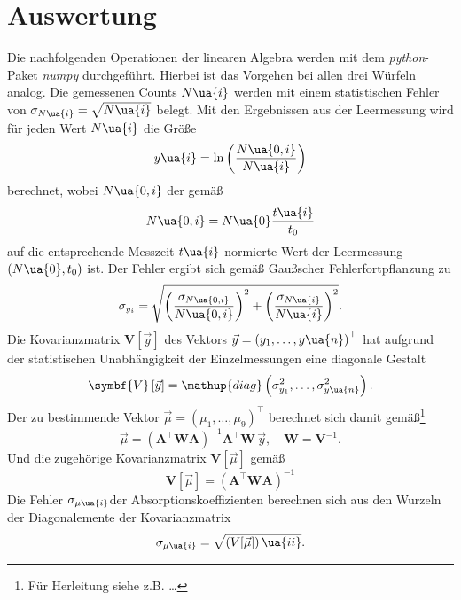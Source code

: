\section{Auswertung}
Die nachfolgenden Operationen der linearen Algebra werden mit dem \emph{python}-Paket
\emph{numpy}\cite{} durchgeführt. Hierbei ist das Vorgehen bei allen drei Würfeln
analog. Die gemessenen Counts $N\ua{i}$ werden mit einem statistischen Fehler
von $\sigma_{N\ua{i}} = \sqrt{N\ua{i}}$ belegt. Mit den Ergebnissen aus
der Leermessung wird für jeden Wert $N\ua{i}$ die Größe
\begin{equation}
  y\ua{i} = \ln\left(\frac{N\ua{0, i}}{N\ua{i}} \right)
  \label{eq: y}
\end{equation}
berechnet, wobei $N\ua{0, i}$ der gemäß
\begin{equation}
  N\ua{0, i} = N\ua{0} \frac{t\ua{i}}{t_0}
  \label{eq: count_skalierung}
\end{equation}
auf die entsprechende Messzeit $t\ua{i}$ normierte Wert der Leermessung $(N\ua{0}, t_0)$ ist.
Der Fehler ergibt sich gemäß Gaußscher Fehlerfortpflanzung zu
\begin{equation}
  \sigma_{y_i} = \sqrt{\left(\frac{\sigma_{N\ua{0, i}}}{N\ua{0, i}} \right)^2 +    \left(\frac{\sigma_{N\ua{i}}}{N\ua{i}} \right)^2}.
\end{equation}
Die Kovarianzmatrix $\symbf{V}\left[\vec{y}\right]$ des Vektors $\vec{y} = \left(y_1, \dots , y\ua{n} \right)^\top$ hat aufgrund der statistischen Unabhängigkeit der
Einzelmessungen eine diagonale Gestalt
\begin{equation}
  \symbf{V}\left[\vec{y}\right] = \mathup{diag}\left(\sigma_{y_1}^2, \dots , \sigma_{y\ua{n}}^2 \right).
\end{equation}
Der zu bestimmende Vektor $\vec{\mu} = \left(\mu_1, \dots , \mu_9 \right)^\top$ berechnet sich damit gemäß\footnote{Für Herleitung siehe z.B. \dots}
\begin{equation}
  \vec{\mu} = \left(\symbf{A}^\top \symbf{W} \symbf{A}\right)^{-1}  \symbf{A}^\top \symbf{W} \, \vec{y}, \quad \symbf{W} = \symbf{V}^{-1}.
  \label{eq: mu}
\end{equation}
Und die zugehörige Kovarianzmatrix $\symbf{V}[\vec{\mu}]$ gemäß
\begin{equation}
  \symbf{V}\left[\vec{\mu}\right] = \left( \symbf{A}^\top \symbf{W}  \symbf{A}\right)^{-1}
\end{equation}
Die Fehler $\sigma_{\mu\ua{i}}$der Absorptionskoeffizienten berechnen sich aus den Wurzeln der Diagonalemente der Kovarianzmatrix
\begin{equation}
 \sigma_{\mu\ua{i}} = \sqrt{\left(V[\vec{\mu}]\right)\ua{ii}}.
 \label{eq: sigma_mu}
\end{equation}


